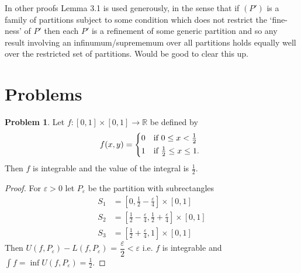 \documentclass[20pt]{article}
\theoremstyle{plain}
\theoremstyle{definition}
\newtheorem*{problem}{Problem}
\newcommand{\reals}{\mathbb{R}}
\begin{document}
In other proofs Lemma 3.1 is used generously, in the sense that if $(P')$
is a family of partitions subject to some condition which does not restrict the
`fine-ness' of $P'$
then each $P'$ is a refinement of some generic partition and so any result
involving an infinumum/suprememum over all partitions holds equally well over
the restricted set of partitions.  Would be good to clear this up.













































\break
\section{Problems}

\begin{problem}{3.1}
  Let $f: [0,1] \times [0, 1] \to \reals$ be defined by
 \begin{equation*}
    f(x, y) =
    \begin{cases*}
      0 & if $0 \leq x < \frac{1}{2}$ \\
      1 & if $ \frac{1}{2} \leq x \leq 1 $.
    \end{cases*}
  \end{equation*}
Then $f$ is integrable and the value of the integral is $\frac{1}{2}.$
\end{problem}

\begin{proof}
  For $\varepsilon > 0$ let $P_\varepsilon$ be the partition with subrectangles
  \begin{align*}
    S_1 &= [0, \frac{1}{2} - \frac{\varepsilon}{4}] \times [0, 1] \\
    S_2 &= [\frac{1}{2} -\frac{\varepsilon}{4}, \frac{1}{2} + \frac{\varepsilon}{4}] \times [0, 1] \\
    S_3 &= [\frac{1}{2} + \frac{\varepsilon}{4}, 1] \times [0, 1]
   \end{align*}
   Then
   $U(f, P_\varepsilon) - L(f, P_\varepsilon)$ = $\dfrac{\varepsilon}{2} < \varepsilon$
   i.e. $f$ is integrable
   and $\int f = \inf U(f, P_\varepsilon) = \frac{1}{2}.$
\end{proof}
\end{document}
